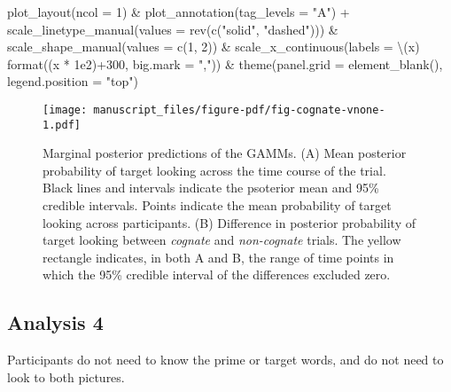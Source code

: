 \documentclass[
  letterpaper,
  DIV=11,
  numbers=noendperiod]{scrartcl}
\newenvironment{Shaded}{\begin{snugshade}}{\end{snugshade}}
\newcommand{\AttributeTok}[1]{\textcolor[rgb]{0.40,0.45,0.13}{#1}}
\newcommand{\DecValTok}[1]{\textcolor[rgb]{0.68,0.00,0.00}{#1}}
\newcommand{\FloatTok}[1]{\textcolor[rgb]{0.68,0.00,0.00}{#1}}
\newcommand{\FunctionTok}[1]{\textcolor[rgb]{0.28,0.35,0.67}{#1}}
\newcommand{\NormalTok}[1]{\textcolor[rgb]{0.00,0.23,0.31}{#1}}
\newcommand{\SpecialCharTok}[1]{\textcolor[rgb]{0.37,0.37,0.37}{#1}}
\newcommand{\StringTok}[1]{\textcolor[rgb]{0.13,0.47,0.30}{#1}}
\begin{document}
\begin{Shaded}
\begin{Highlighting}[]
    \FunctionTok{plot\_layout}\NormalTok{(}\AttributeTok{ncol =} \DecValTok{1}\NormalTok{) }\SpecialCharTok{\&}
    \FunctionTok{plot\_annotation}\NormalTok{(}\AttributeTok{tag\_levels =} \StringTok{"A"}\NormalTok{) }\SpecialCharTok{+}
    \FunctionTok{scale\_linetype\_manual}\NormalTok{(}\AttributeTok{values =} \FunctionTok{rev}\NormalTok{(}\FunctionTok{c}\NormalTok{(}\StringTok{"solid"}\NormalTok{, }\StringTok{"dashed"}\NormalTok{))) }\SpecialCharTok{\&}
    \FunctionTok{scale\_shape\_manual}\NormalTok{(}\AttributeTok{values =} \FunctionTok{c}\NormalTok{(}\DecValTok{1}\NormalTok{, }\DecValTok{2}\NormalTok{)) }\SpecialCharTok{\&}
    \FunctionTok{scale\_x\_continuous}\NormalTok{(}\AttributeTok{labels =}\NormalTok{ \textbackslash{}(x) }\FunctionTok{format}\NormalTok{((x }\SpecialCharTok{*} \FloatTok{1e2}\NormalTok{)}\SpecialCharTok{+}\DecValTok{300}\NormalTok{, }
                                            \AttributeTok{big.mark =} \StringTok{","}\NormalTok{)) }\SpecialCharTok{\&}
    \FunctionTok{theme}\NormalTok{(}\AttributeTok{panel.grid =} \FunctionTok{element\_blank}\NormalTok{(),}
          \AttributeTok{legend.position =} \StringTok{"top"}\NormalTok{) }
\end{Highlighting}
\end{Shaded}

\begin{figure}[H]

{\centering \texttt{[image: manuscript\_files/figure-pdf/fig-cognate-vnone-1.pdf]}

}

\caption{\label{fig-cognate-vnone}Marginal posterior predictions of the
GAMMs. (A) Mean posterior probability of target looking across the time
course of the trial. Black lines and intervals indicate the psoterior
mean and 95\% credible intervals. Points indicate the mean probability
of target looking across participants. (B) Difference in posterior
probability of target looking between \emph{cognate} and
\emph{non-cognate} trials. The yellow rectangle indicates, in both A and
B, the range of time points in which the 95\% credible interval of the
differences excluded zero.}

\end{figure}

\hypertarget{analysis-4}{%
\subsection{Analysis 4}\label{analysis-4}}

Participants do not need to know the prime or target words, and do not
need to look to both pictures.
\end{document}
